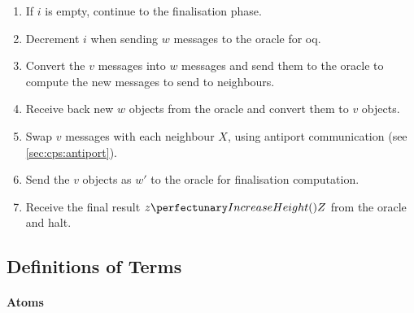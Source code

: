 \begin{enumerate}
    \item If \(i\) is empty, continue to the \textsf{finalisation} phase.
    \item Decrement \(i\) when sending \(w\) messages to the oracle for \gls{oq}.
    \item Convert the \(v\) messages into \(w\) messages and send them to the oracle to compute the new messages to send to neighbours.
    \item Receive back new \(w\) objects from the oracle and convert them to \(v\) objects.
    \item Swap \(v\) messages with each neighbour \(X\), using antiport communication (see \cref{sec:cps:antiport}).
    \item Send the \(v\) objects as \(w'\) to the oracle for \textsf{finalisation} computation.
    \item Receive the final result \(\cpfunc{z}{Z}\) from the oracle and halt.%
\end{enumerate}

\subsection{\label{sec:nmp:systemwide:definitions}Definitions of Terms}

\paragraph{Atoms}
\begin{description}
\end{description}

